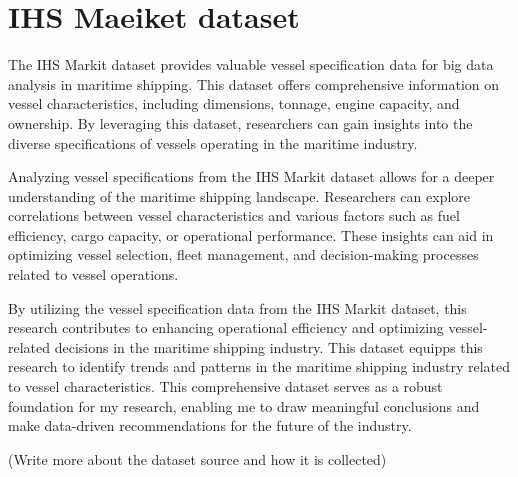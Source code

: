 \section{IHS Maeiket dataset}

The IHS Markit dataset provides valuable vessel specification data for big data analysis in maritime shipping.
This dataset offers comprehensive information on vessel characteristics, including dimensions, tonnage, engine capacity, and ownership.
By leveraging this dataset, researchers can gain insights into the diverse specifications of vessels operating in the maritime industry.

Analyzing vessel specifications from the IHS Markit dataset allows for a deeper understanding of the maritime shipping landscape.
Researchers can explore correlations between vessel characteristics and various factors such as fuel efficiency, cargo capacity, or operational performance.
These insights can aid in optimizing vessel selection, fleet management, and decision-making processes related to vessel operations.

By utilizing the vessel specification data from the IHS Markit dataset, this research contributes to enhancing operational efficiency and optimizing vessel-related decisions in the maritime shipping industry.
This dataset equipps this research to identify trends and patterns in the maritime shipping industry related to vessel characteristics.
This comprehensive dataset serves as a robust foundation for my research, enabling me to draw meaningful conclusions and make data-driven recommendations for the future of the industry.


(Write more about the dataset source and how it is collected)
